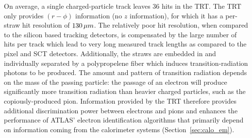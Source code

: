 On average, a single charged-particle track leaves 36 hits in the TRT.
The TRT only provides $(r-\phi)$ information (no $z$ information),
for which it has a per-straw hit resolution of $130\,\mu m$.
The relatively poor hit resolution, when compared to the silicon based
tracking detectors, is compensated by the large number of hits per track which
lead to very long measured track lengths as compared to the pixel and SCT detectors.
Additionally, the straws are embedded in and individually separated by
a polypropelene fiber which induces transition-radiation photons to be produced.
The amount and pattern of transition radiation depends on the mass of the passing
particle: the passage of an electron will produce significantly more transition radiation
than heavier charged particles, such as the copiously-produced pion.
Information provided by the TRT therefore provides additional discrimination
power between electrons and pions and enhances the performance of ATLAS' electron identification algorithms
that primarily depend on information coming from the calorimeter systems (Section~\ref{sec:calo_em}).
